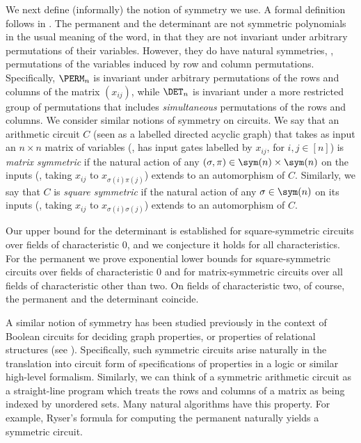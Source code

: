 \documentclass{toc}
\begin{document}
We next define (informally) the notion of symmetry we use. A formal definition
follows in .  The permanent and the determinant are
not symmetric polynomials in the usual meaning of the word, in that they are not
invariant under arbitrary permutations of their variables.  However, they do have
natural symmetries, \eg, permutations of the variables induced by row and column
permutations.  Specifically, $\PERM_n$ %
%
%
is invariant under arbitrary permutations
of the rows and columns of the matrix $(x_{ij})$, while $\DET_n$ is invariant
under a more restricted group of permutations that includes \emph{simultaneous}
permutations of the rows and columns.  We consider
similar notions of symmetry on circuits.  We say that an arithmetic circuit $C$
(seen as a labelled directed acyclic graph) that takes as input an $n \times n$
matrix of variables (\ie, has input gates labelled by $x_{ij}$, for $i, j \in
[n]$) is \emph{matrix symmetric} if the natural action of any $(\sigma,\pi) \in
\sym(n) \times\sym(n)$ on the inputs (\ie, taking $x_{ij}$ to
$x_{\sigma(i)\pi(j)}$) extends to an automorphism of $C$. Similarly, we say
that  %
$C$ is \emph{square symmetric} if the natural action of any $\sigma \in \sym(n)$ on
its inputs (\ie, taking $x_{ij}$ to $x_{\sigma(i)\sigma(j)}$) extends to an
automorphism of $C$.

Our upper bound for the determinant is established for
%
square-symmetric  %
%
circuits over fields of characteristic $0$, and we conjecture it holds for all characteristics. For the permanent we prove exponential lower bounds for square-symmetric circuits over fields of characteristic $0$ and for matrix-symmetric circuits over all fields of characteristic other than two.  On fields of characteristic two, of course, the permanent and the determinant coincide.

A similar notion of symmetry has been studied previously in the context of
Boolean circuits for deciding graph properties, or properties of relational
structures (see \cite{DenenbergGS86,Otto96,AndersonD17}). Specifically, such
symmetric circuits arise naturally in the translation into circuit form of
specifications of properties in a logic or similar high-level formalism.
Similarly, we can think of a symmetric arithmetic circuit as a straight-line
program which treats the rows and columns of a matrix as being indexed by
unordered sets. Many natural algorithms have this property. For example, Ryser's
formula for computing the permanent naturally yields a symmetric circuit.
\end{document}

